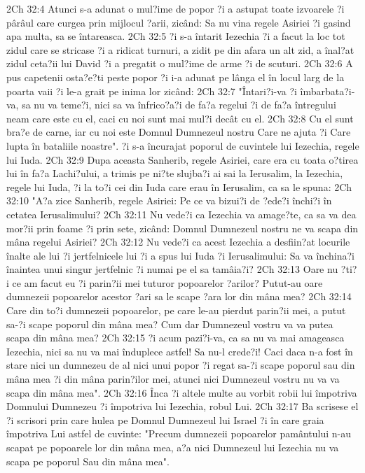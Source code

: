 2Ch 32:4  Atunci s-a adunat o mul?ime de popor ?i a astupat toate izvoarele ?i pârâul care curgea prin mijlocul ?arii, zicând: Sa nu vina regele Asiriei ?i gasind apa multa, sa se întareasca.
2Ch 32:5  ?i s-a întarit Iezechia ?i a facut la loc tot zidul care se stricase ?i a ridicat turnuri, a zidit pe din afara un alt zid, a înal?at zidul ceta?ii lui David ?i a pregatit o mul?ime de arme ?i de scuturi.
2Ch 32:6  A pus capetenii osta?e?ti peste popor ?i i-a adunat pe lânga el în locul larg de la poarta vaii ?i le-a grait pe inima lor zicând:
2Ch 32:7  "Întari?i-va ?i îmbarbata?i-va, sa nu va teme?i, nici sa va înfrico?a?i de fa?a regelui ?i de fa?a întregului neam care este cu el, caci cu noi sunt mai mul?i decât cu el.
2Ch 32:8  Cu el sunt bra?e de carne, iar cu noi este Domnul Dumnezeul nostru Care ne ajuta ?i Care lupta în bataliile noastre". ?i s-a încurajat poporul de cuvintele lui Iezechia, regele lui Iuda.
2Ch 32:9  Dupa aceasta Sanherib, regele Asiriei, care era cu toata o?tirea lui în fa?a Lachi?ului, a trimis pe ni?te slujba?i ai sai la Ierusalim, la Iezechia, regele lui Iuda, ?i la to?i cei din Iuda care erau în Ierusalim, ca sa le spuna:
2Ch 32:10  "A?a zice Sanherib, regele Asiriei: Pe ce va bizui?i de ?ede?i închi?i în cetatea Ierusalimului?
2Ch 32:11  Nu vede?i ca Iezechia va amage?te, ca sa va dea mor?ii prin foame ?i prin sete, zicând: Domnul Dumnezeul nostru ne va scapa din mâna regelui Asiriei?
2Ch 32:12  Nu vede?i ca acest Iezechia a desfiin?at locurile înalte ale lui ?i jertfelnicele lui ?i a spus lui Iuda ?i Ierusalimului: Sa va închina?i înaintea unui singur jertfelnic ?i numai pe el sa tamâia?i?
2Ch 32:13  Oare nu ?ti?i ce am facut eu ?i parin?ii mei tuturor popoarelor ?arilor? Putut-au oare dumnezeii popoarelor acestor ?ari sa le scape ?ara lor din mâna mea?
2Ch 32:14  Care din to?i dumnezeii popoarelor, pe care le-au pierdut parin?ii mei, a putut sa-?i scape poporul din mâna mea? Cum dar Dumnezeul vostru va va putea scapa din mâna mea?
2Ch 32:15  ?i acum pazi?i-va, ca sa nu va mai amageasca Iezechia, nici sa nu va mai înduplece astfel! Sa nu-l crede?i! Caci daca n-a fost în stare nici un dumnezeu de al nici unui popor ?i regat sa-?i scape poporul sau din mâna mea ?i din mâna parin?ilor mei, atunci nici Dumnezeul vostru nu va va scapa din mâna mea".
2Ch 32:16  Înca ?i altele multe au vorbit robii lui împotriva Domnului Dumnezeu ?i împotriva lui Iezechia, robul Lui.
2Ch 32:17  Ba scrisese el ?i scrisori prin care hulea pe Domnul Dumnezeul lui Israel ?i în care graia împotriva Lui astfel de cuvinte: "Precum dumnezeii popoarelor pamântului n-au scapat pe popoarele lor din mâna mea, a?a nici Dumnezeul lui Iezechia nu va scapa pe poporul Sau din mâna mea".

